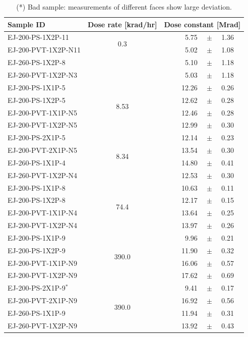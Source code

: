 \documentclass[review]{elsarticle}
\begin{document}
\begin{table}[hbtp]
  \centering
  \begin{tabular}{l c l@{\hspace{1.8em}}r@{ }c@{ }l}
    \hline\hline
    Sample ID & Dose rate [krad/hr] & \multicolumn{4}{c}{Dose constant [Mrad]} \\
    \hline
    EJ-200-PS-1X2P-11   & \multirow{2}{*}{0.3} & & 5.75 & $\pm$ & 1.36 \\
    EJ-200-PVT-1X2P-N11 & & & 5.02 & $\pm$ & 1.08 \\
    EJ-260-PS-1X2P-8    & & & 5.10 & $\pm$ & 1.18 \\
    EJ-260-PVT-1X2P-N3  & & & 5.03 & $\pm$ & 1.18 \\
    \hline
    EJ-200-PS-1X1P-5   & \multirow{4}{*}{8.53} & & 12.26 & $\pm$ & 0.26 \\
    EJ-200-PS-1X2P-5   & & & 12.62 & $\pm$ & 0.28 \\
    EJ-200-PVT-1X1P-N5 & & & 12.46 & $\pm$ & 0.28 \\
    EJ-200-PVT-1X2P-N5 & & & 12.99 & $\pm$ & 0.30 \\
    \hline
    EJ-200-PS-2X1P-5   & \multirow{4}{*}{8.34} & & 12.14 & $\pm$ & 0.23 \\
    EJ-200-PVT-2X1P-N5 & & & 13.54 & $\pm$ & 0.30 \\
    EJ-260-PS-1X1P-4   & & & 14.80 & $\pm$ & 0.41 \\
    EJ-260-PVT-1X2P-N4 & & & 12.53 & $\pm$ & 0.30 \\
    \hline
    EJ-200-PS-1X1P-8   & \multirow{4}{*}{74.4} & & 10.63 & $\pm$ & 0.11 \\
    EJ-200-PS-1X2P-8   & & & 12.17 & $\pm$ & 0.15 \\
    EJ-200-PVT-1X1P-N4 & & & 13.64 & $\pm$ & 0.25 \\
    EJ-200-PVT-1X2P-N4 & & & 13.97 & $\pm$ & 0.26 \\
    \hline
    EJ-200-PS-1X1P-9   & \multirow{4}{*}{390.0} & & 9.96 & $\pm$ & 0.21 \\
    EJ-200-PS-1X2P-9   & & & 11.90 & $\pm$ & 0.32 \\
    EJ-200-PVT-1X1P-N9 & & & 16.06 & $\pm$ & 0.57 \\
    EJ-200-PVT-1X2P-N9 & & & 17.62 & $\pm$ & 0.69 \\
    \hline
    EJ-200-PS-2X1P-9$^*$   & \multirow{4}{*}{390.0} & & 9.41 & $\pm$ & 0.17 \\
    EJ-200-PVT-2X1P-N9 & & & 16.92 & $\pm$ & 0.56 \\
    EJ-260-PS-1X1P-9   & & & 11.94 & $\pm$ & 0.31 \\
    EJ-260-PVT-1X2P-N9 & & & 13.92 & $\pm$ & 0.43 \\
    \hline
  \end{tabular}
  \caption{(*) Bad sample: measurements of different faces show large deviation.}
  \label{tab:results}
\end{table}
\end{document}
